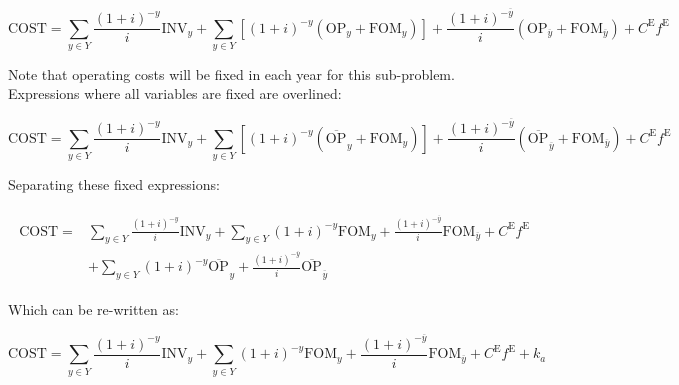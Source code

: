 \documentclass{article}
\newcommand{\sYears}{Y}
\newcommand{\iGenerator}{g}
\newcommand{\iYear}{y}
\newcommand{\iYearTerminal}{\overline{\iYear}}
\newcommand{\iScenario}{s}
\newcommand{\cOperatingCost}[1][\iYear,\iScenario]{\mathrm{OP}_{#1}}
\newcommand{\cFixedOperationsMaintenanceCost}[1][\iGenerator]{\mathrm{FOM}_{#1}}
\newcommand{\cInvestmentCost}[1][\iYear]{\mathrm{INV}_{#1}}
\newcommand{\cInterestRate}{i}
\newcommand{\cEmissionsTargetViolationPenalty}{C^{\mathrm{E}}}
\newcommand{\cObjectiveFunction}{\mathrm{COST}}
\newcommand{\vEmissionsTargetViolation}{f^{\mathrm{E}}}
\begin{document}
\begin{equation}
\cObjectiveFunction = \sum\limits_{\iYear \in \sYears} \frac{(1+\cInterestRate)^{-\iYear}}{\cInterestRate}\cInvestmentCost + \sum\limits_{\iYear \in \sYears} \left[(1+\cInterestRate)^{-\iYear} (\cOperatingCost[\iYear] + \cFixedOperationsMaintenanceCost[\iYear]) \right] + \frac{(1+\cInterestRate)^{-\iYearTerminal}}{\cInterestRate} \left(\cOperatingCost[\iYearTerminal] + \cFixedOperationsMaintenanceCost[\iYearTerminal] \right) + \cEmissionsTargetViolationPenalty \vEmissionsTargetViolation
\end{equation}

Note that operating costs will be fixed in each year for this sub-problem. Expressions where all variables are fixed are overlined:

\begin{equation}
\cObjectiveFunction = \sum\limits_{\iYear \in \sYears} \frac{(1+\cInterestRate)^{-\iYear}}{\cInterestRate}\cInvestmentCost + \sum\limits_{\iYear \in \sYears} \left[(1+\cInterestRate)^{-\iYear} (\overline{\cOperatingCost[]}_{\iYear} + \cFixedOperationsMaintenanceCost[\iYear]) \right] + \frac{(1+\cInterestRate)^{-\iYearTerminal}}{\cInterestRate} \left(\overline{\cOperatingCost[]}_{\iYearTerminal} + \cFixedOperationsMaintenanceCost[\iYearTerminal] \right) + \cEmissionsTargetViolationPenalty \vEmissionsTargetViolation
\end{equation}

Separating these fixed expressions:

\begin{align}
	\begin{split}
		\cObjectiveFunction = &\sum\limits_{\iYear \in \sYears} \frac{(1+\cInterestRate)^{-\iYear}}{\cInterestRate}\cInvestmentCost + \sum\limits_{\iYear \in \sYears} (1+\cInterestRate)^{-\iYear} \cFixedOperationsMaintenanceCost[\iYear]  + \frac{(1+\cInterestRate)^{-\iYearTerminal}}{\cInterestRate} \cFixedOperationsMaintenanceCost[\iYearTerminal] + \cEmissionsTargetViolationPenalty \vEmissionsTargetViolation\\
		& + \sum\limits_{\iYear \in \sYears} (1+\cInterestRate)^{-\iYear} \overline{\cOperatingCost[]}_{\iYear} + \frac{(1+\cInterestRate)^{-\iYearTerminal}}{\cInterestRate} \overline{\cOperatingCost[]}_{\iYearTerminal}
	\end{split}
\end{align}

Which can be re-written as:

\begin{equation}
	\cObjectiveFunction = \sum\limits_{\iYear \in \sYears} \frac{(1+\cInterestRate)^{-\iYear}}{\cInterestRate}\cInvestmentCost + \sum\limits_{\iYear \in \sYears} (1+\cInterestRate)^{-\iYear} \cFixedOperationsMaintenanceCost[\iYear]  + \frac{(1+\cInterestRate)^{-\iYearTerminal}}{\cInterestRate} \cFixedOperationsMaintenanceCost[\iYearTerminal] + \cEmissionsTargetViolationPenalty \vEmissionsTargetViolation + k_{a}
\end{equation}
\end{document}
